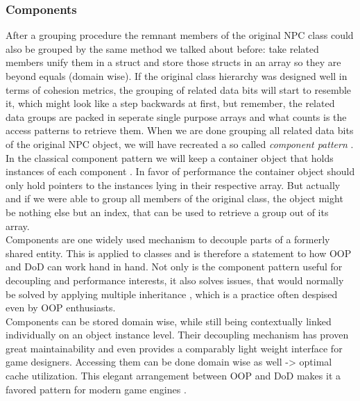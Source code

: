 \subsubsection{Components}
After a grouping procedure the remnant members of the original NPC class could also be grouped by the same method we talked about before: take related members unify them in a struct and store those structs in an array so they are beyond equals (domain wise). If the original class hierarchy was designed well in terms of cohesion metrics, the grouping of related data bits will start to resemble it, which might look like a step backwards at first, but remember, the related data groups are packed in seperate single purpose arrays and what counts is the access patterns to retrieve them. When we are done grouping all related data bits of the original NPC object, we will have recreated a so called \textit{component pattern} .\\
In the classical component pattern we will keep a container object that holds instances of each component . In favor of performance the container object should only hold pointers to the instances lying in their respective array. But actually and if we were able to group all members of the original class, the object might be nothing else but an index, that can be used to retrieve a group out of its array.\\
Components are one widely used mechanism to decouple parts of a formerly shared entity. This is applied to classes and is therefore a statement to how OOP and DoD can work hand in hand. Not only is the component pattern useful for decoupling and performance interests, it also solves issues, that would normally be solved by applying multiple inheritance , which is a practice often despised even by OOP enthusiasts.\\
Components can be stored domain wise, while still being contextually linked individually on an object instance level. Their decoupling mechanism has proven great maintainability and even provides a comparably light weight interface for game designers. Accessing them can be done domain wise as well -> optimal cache utilization. This elegant arrangement between OOP and DoD makes it a favored pattern for modern game engines .
